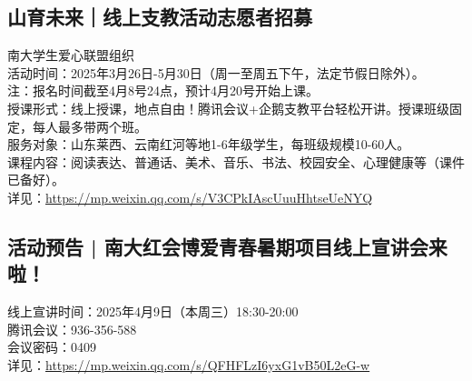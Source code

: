 \documentclass[letterpaper, 12pt]{article}
\begin{document}
\begin{multicols}{2}
\subsection{山育未来｜线上支教活动志愿者招募}
南大学生爱心联盟组织\\
活动时间：2025年3月26日-5月30日（周一至周五下午，法定节假日除外）。
\\注：报名时间截至4月8号24点，预计4月20号开始上课。
\\授课形式：线上授课，地点自由！腾讯会议+企鹅支教平台轻松开讲。授课班级固定，每人最多带两个班。
\\服务对象：山东莱西、云南红河等地1-6年级学生，每班级规模10-60人。
\\课程内容：阅读表达、普通话、美术、音乐、书法、校园安全、心理健康等（课件已备好）。
\\详见：\url{https://mp.weixin.qq.com/s/V3CPkIAscUuuHhtseUeNYQ}

\subsection{活动预告 | 南大红会博爱青春暑期项目线上宣讲会来啦！}
线上宣讲时间：2025年4月9日（本周三）18:30-20:00
\\腾讯会议：936-356-588
\\会议密码：0409
\\详见：\url{https://mp.weixin.qq.com/s/QFHFLzI6yxG1vB50L2eG-w}


\end{multicols}
\end{document}
